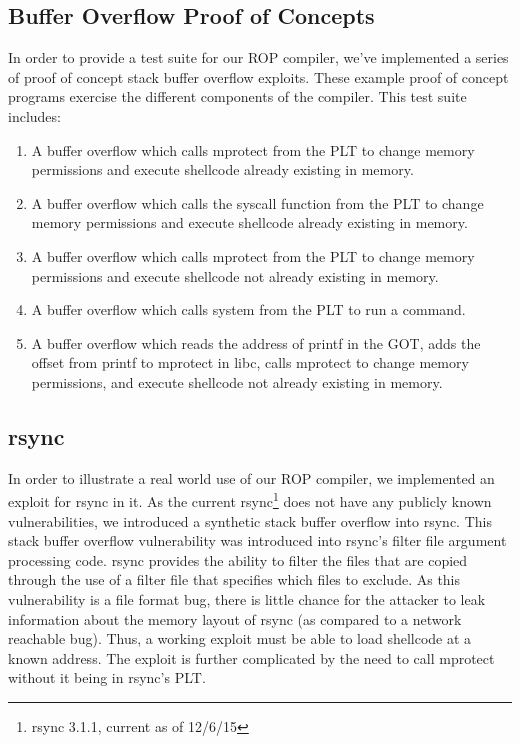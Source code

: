 \documentclass[journal]{IEEEtran}
\begin{document}
\subsection{Buffer Overflow Proof of Concepts}
In order to provide a test suite for our ROP compiler, we've implemented a series of proof of concept stack buffer overflow exploits.
These example proof of concept programs exercise the different components of the compiler.
This test suite includes:
\begin{enumerate}
  \item A buffer overflow which calls mprotect from the PLT to change memory permissions and execute shellcode already existing in memory.
  \item A buffer overflow which calls the syscall function from the PLT to change memory permissions and execute shellcode already existing in memory.
  \item A buffer overflow which calls mprotect from the PLT to change memory permissions and execute shellcode not already existing in memory.
  \item A buffer overflow which calls system from the PLT to run a command.
  \item A buffer overflow which reads the address of printf in the GOT, adds the offset from printf to mprotect in libc, calls
  mprotect to change memory permissions, and execute shellcode not already existing in memory.
\end{enumerate}

\subsection{rsync}
In order to illustrate a real world use of our ROP compiler, we implemented an exploit for rsync in it.
As the current rsync\footnote{rsync 3.1.1, current as of 12/6/15} does not have any publicly known vulnerabilities, we introduced a synthetic stack buffer overflow into rsync.
This stack buffer overflow vulnerability was introduced into rsync's filter file argument processing code.
rsync provides the ability to filter the files that are copied through the use of a filter file that specifies which files to exclude.
As this vulnerability is a file format bug, there is little chance for the attacker to leak information about the memory layout of rsync (as compared to a network reachable bug).
Thus, a working exploit must be able to load shellcode at a known address.
The exploit is further complicated by the need to call mprotect without it being in rsync's PLT.
\end{document}
